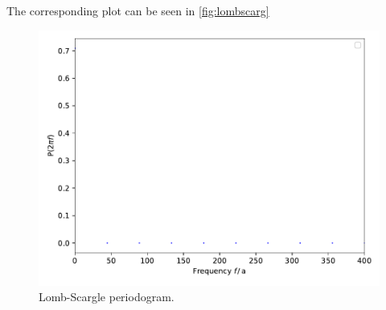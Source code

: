 The corresponding plot can be seen in \autoref{fig:lombscarg}

\begin{figure}
    \centering
    \includegraphics{../lomb_scarg.pdf}
    \caption{Lomb-Scargle periodogram.}
    \label{fig:lombscarg}
\end{figure}
